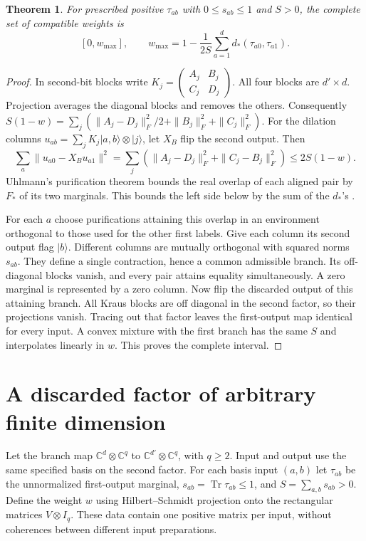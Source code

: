 \documentclass[11pt,letterpaper]{article}
\newtheorem{theorem}{Theorem}\newtheorem{proposition}[theorem]{Proposition}
\newcommand{\tr}{\operatorname{Tr}}\newcommand{\ket}[1]{\lvert#1\rangle}\newcommand{\proj}[1]{\ket{#1}\!\langle#1\rvert}
\begin{document}
\begin{theorem}
For prescribed positive $\tau_{ab}$ with $0\le s_{ab}\le1$ and $S>0$, the complete set of compatible weights is
\[
 [0,w_{\max}],\qquad
 w_{\max}=1-\frac1{2S}\sum_{a=1}^d d_*(\tau_{a0},\tau_{a1}).
\]
\end{theorem}
\begin{proof}
In second-bit blocks write $K_j=\left(\begin{smallmatrix}A_j&B_j\\ C_j&D_j\end{smallmatrix}\right)$. All four blocks are $d'\times d$. Projection averages the diagonal blocks and removes the others. Consequently $S(1-w)=\sum_j(\|A_j-D_j\|_F^2/2+\|B_j\|_F^2+\|C_j\|_F^2)$. For the dilation columns $u_{ab}=\sum_jK_j\ket{a,b}\otimes\ket j$, let $X_B$ flip the second output. Then
\[
 \sum_a\|u_{a0}-X_Bu_{a1}\|^2
 =\sum_j(\|A_j-D_j\|_F^2+\|C_j-B_j\|_F^2)\le2S(1-w).
\]
Uhlmann's purification theorem bounds the real overlap of each aligned pair by $F_*$ of its two marginals. This bounds the left side below by the sum of the $d_*$'s \cite[Theorem~3.22]{watrous}.

For each $a$ choose purifications attaining this overlap in an environment orthogonal to those used for the other first labels. Give each column its second output flag $\ket b$. Different columns are mutually orthogonal with squared norms $s_{ab}$. They define a single contraction, hence a common admissible branch. Its off-diagonal blocks vanish, and every pair attains equality simultaneously. A zero marginal is represented by a zero column. Now flip the discarded output of this attaining branch. All Kraus blocks are off diagonal in the second factor, so their projections vanish. Tracing out that factor leaves the first-output map identical for every input. A convex mixture with the first branch has the same $S$ and interpolates linearly in $w$. This proves the complete interval.
\end{proof}
\section{A discarded factor of arbitrary finite dimension}
Let the branch map $\mathbb C^d\otimes\mathbb C^q$ to $\mathbb C^{d'}\otimes\mathbb C^q$, with $q\ge2$. Input and output use the same specified basis on the second factor. For each basis input $(a,b)$ let $\tau_{ab}$ be the unnormalized first-output marginal, $s_{ab}=\tr\tau_{ab}\le1$, and $S=\sum_{a,b}s_{ab}>0$. Define the weight $w$ using Hilbert--Schmidt projection onto the rectangular matrices $V\otimes I_q$. These data contain one positive matrix per input, without coherences between different input preparations.
\end{document}
